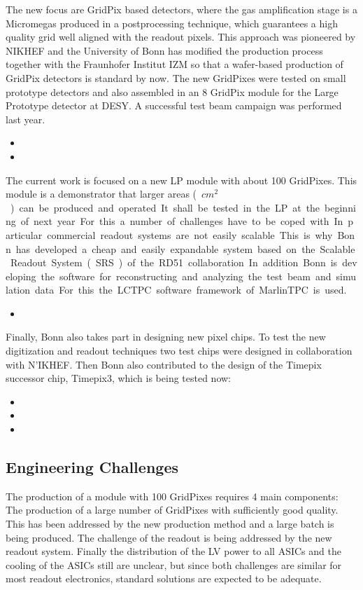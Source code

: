 The new focus are GridPix based detectors, where the gas amplification stage is a Micromegas produced in a postprocessing technique, which guarantees a high quality grid well aligned with the readout pixels. This approach was pioneered by NIKHEF and the University of Bonn has modified the production process together with the Fraunhofer Institut IZM so that a wafer-based production of GridPix detectors is standard by now. The new GridPixes were tested on small prototype detectors and also assembled in an 8 GridPix module for the Large Prototype detector at DESY. A successful test beam campaign was performed last year.
\begin{itemize}
\item {}
\item {}
\end{itemize}
The current work is focused on a new LP module with about 100 GridPixes. This module is a demonstrator that larger areas (~\unit[400]{$cm^2$}) can be produced and operated. It shall be tested in the LP at the beginning of next year. For this a number of challenges have to be coped with. In particular commercial readout systems are not easily scalable. This is why Bonn has developed a cheap and easily expandable system based on the Scalable Readout System (SRS) of the RD51 collaboration.
In addition Bonn is developing the software for reconstructing and analyzing the test beam and simulation data. For this the LCTPC software framework of MarlinTPC is used.
\begin{itemize}
\item {}
\end{itemize}
Finally, Bonn also takes part in designing new pixel chips. To test the new digitization and readout techniques two test chips were designed in collaboration with N'IKHEF. Then Bonn also contributed to the design of the Timepix successor chip, Timepix3, which is being tested now:
\begin{itemize}
\item {}
\item {}
\item {}
\end{itemize}

\subsection{Engineering Challenges}
The production of a module with 100 GridPixes requires 4 main components: The production of a
large number of GridPixes with sufficiently good quality. This has been addressed by the new production method and a large batch is being produced. The challenge of the readout is being addressed by the new readout system. Finally the distribution of the LV power to all ASICs and the cooling of the ASICs still are unclear, but since both challenges are similar for most readout electronics, standard solutions are expected to be adequate.


